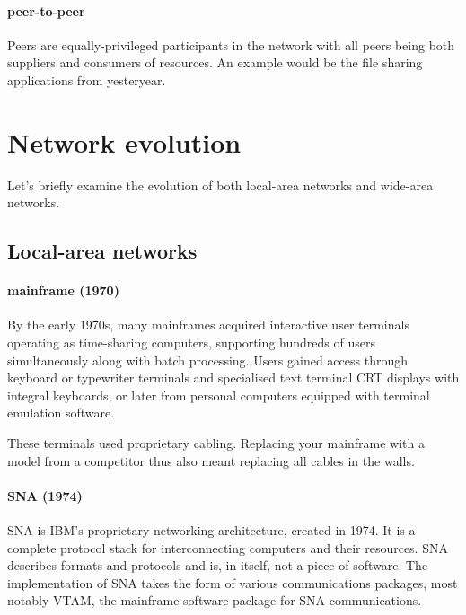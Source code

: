 \paragraph{peer-to-peer}
Peers are equally-privileged participants in the network with all peers being both suppliers and consumers of resources.
An example would be the file sharing applications from yesteryear.




\section{Network evolution}
\label{sec:network-evolution}

Let's briefly examine the evolution of both local-area networks and wide-area networks.

\subsection{Local-area networks}
\label{sec:network-evolution-lan}

\paragraph{mainframe (1970)}%
By the early 1970s, many mainframes acquired interactive user terminals operating as time-sharing computers, supporting hundreds of users simultaneously along with batch processing.
Users gained access through keyboard or typewriter terminals%
and specialised text terminal \gls{CRT} displays with integral keyboards, or later from personal computers equipped with terminal emulation software.

These terminals used proprietary cabling.
Replacing your mainframe with a model from a competitor thus also meant replacing all cables in the walls.
    
\paragraph{\acl{SNA} (1974)}
\Gls{SNA} is IBM's proprietary networking architecture, created in 1974.
It is a complete protocol stack for interconnecting computers and their resources.
\gls{SNA} describes formats and protocols and is, in itself, not a piece of software.
The implementation of \gls{SNA} takes the form of various communications packages, most notably \gls{VTAM}, the mainframe software package for \gls{SNA} communications.
    
